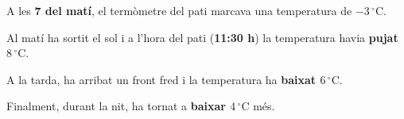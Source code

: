 \documentclass[12pt, a4paper, addpoints]{exam}
\begin{document}
\begin{questions}
\vspace{0.4cm}

\question[3] A les \textbf{7 del matí}, el termòmetre del pati marcava una temperatura de \textbf{$-3\,^{\circ}\mathrm{C}$}. 

Al matí ha sortit el sol i a l'hora del pati (\textbf{11:30 h}) la temperatura havia \textbf{pujat $8\,^{\circ}\mathrm{C}$}. 

A la tarda, ha arribat un front fred i la temperatura ha \textbf{baixat $6\,^{\circ}\mathrm{C}$}. 

Finalment, durant la nit, ha tornat a \textbf{baixar $4\,^{\circ}\mathrm{C}$} més.


\end{questions}
\end{document}
